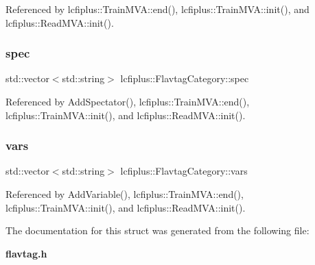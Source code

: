 Referenced by lcfiplus\+::\+Train\+M\+V\+A\+::end(), lcfiplus\+::\+Train\+M\+V\+A\+::init(), and lcfiplus\+::\+Read\+M\+V\+A\+::init().

\mbox{\label{structlcfiplus_1_1FlavtagCategory_a5d70094f45fcd7b7ae75d9ec2f309948}} 
\subsubsection{spec}
{\footnotesize\ttfamily std\+::vector$<$std\+::string$>$ lcfiplus\+::\+Flavtag\+Category\+::spec}



Referenced by Add\+Spectator(), lcfiplus\+::\+Train\+M\+V\+A\+::end(), lcfiplus\+::\+Train\+M\+V\+A\+::init(), and lcfiplus\+::\+Read\+M\+V\+A\+::init().

\mbox{\label{structlcfiplus_1_1FlavtagCategory_a00016d50d6a8a41b087a55083e0e5be6}} 
\subsubsection{vars}
{\footnotesize\ttfamily std\+::vector$<$std\+::string$>$ lcfiplus\+::\+Flavtag\+Category\+::vars}



Referenced by Add\+Variable(), lcfiplus\+::\+Train\+M\+V\+A\+::end(), lcfiplus\+::\+Train\+M\+V\+A\+::init(), and lcfiplus\+::\+Read\+M\+V\+A\+::init().



The documentation for this struct was generated from the following file\+:\begin{DoxyCompactItemize}
\item 
\textbf{ flavtag.\+h}\end{DoxyCompactItemize}
